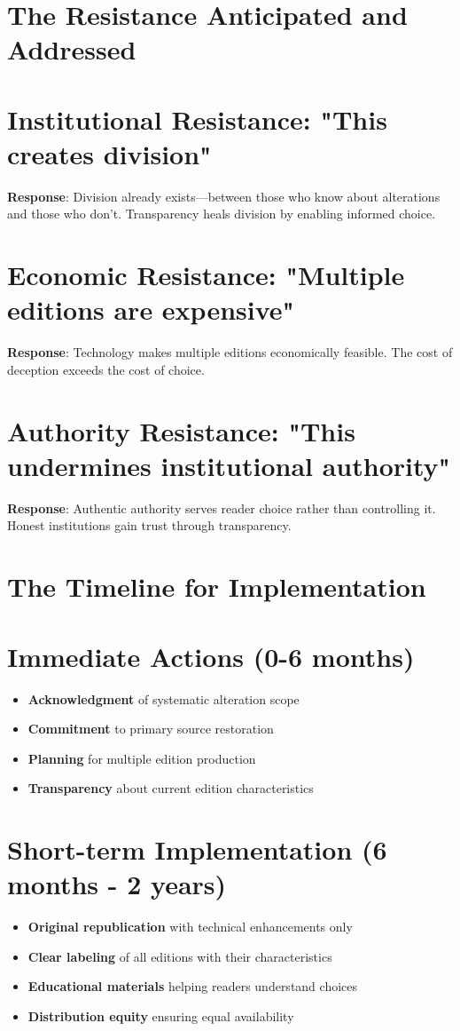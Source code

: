 \documentclass[11pt,twoside]{book}
\begin{document}
\section*{The Resistance Anticipated and Addressed}
\label{sec:org990e5ff}

\section*{Institutional Resistance: "This creates division"}
\label{sec:orgf969a5c}
\textbf{\textbf{Response}}: Division already exists—between those who know about alterations and those who don't. Transparency heals division by enabling informed choice.
\section*{Economic Resistance: "Multiple editions are expensive"}
\label{sec:org114b9eb}
\textbf{\textbf{Response}}: Technology makes multiple editions economically feasible. The cost of deception exceeds the cost of choice.
\section*{Authority Resistance: "This undermines institutional authority"}
\label{sec:org160f3d2}
\textbf{\textbf{Response}}: Authentic authority serves reader choice rather than controlling it. Honest institutions gain trust through transparency.
\section*{The Timeline for Implementation}
\label{sec:org7f883e6}

\section*{Immediate Actions (0-6 months)}
\label{sec:org390537e}
\begin{itemize}
\item \textbf{\textbf{Acknowledgment}} of systematic alteration scope
\item \textbf{\textbf{Commitment}} to primary source restoration
\item \textbf{\textbf{Planning}} for multiple edition production
\item \textbf{\textbf{Transparency}} about current edition characteristics
\end{itemize}
\section*{Short-term Implementation (6 months - 2 years)}
\label{sec:org8cf7d97}
\begin{itemize}
\item \textbf{\textbf{Original republication}} with technical enhancements only
\item \textbf{\textbf{Clear labeling}} of all editions with their characteristics
\item \textbf{\textbf{Educational materials}} helping readers understand choices
\item \textbf{\textbf{Distribution equity}} ensuring equal availability
\end{itemize}
\end{document}
